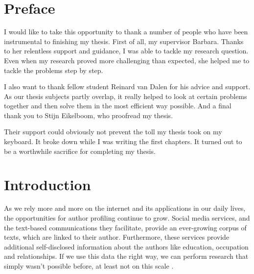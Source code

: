 \documentclass[
10pt, %
a4paper, %
oneside, %
headinclude,footinclude, %
] {book}%
\begin{document}




\chapter*{Preface}

I would like to take this opportunity to thank a number of people who have been instrumental to finishing my thesis. 
First of all, my supervisor Barbara. Thanks to her relentless support and guidance, I was able to tackle my research question. Even when my research proved more challenging than expected, she helped me to tackle the problems step by step. 

I also want to thank fellow student Reinard van Dalen for his advice and support. As our thesis subjects partly overlap, it really helped to look at certain problems together and then solve them in the most efficient way possible. And a final thank you to Stijn Eikelboom, who proofread my thesis.


Their support could obviously not prevent the toll my thesis took on my keyboard. It broke down while I was writing the first chapters. It turned out to be a worthwhile sacrifice for completing my thesis. 





\chapter{Introduction}
As we rely more and more on the internet and its applications in our daily lives, the opportunities for author profiling continue to grow. Social media services, and the text-based communications they facilitate, provide an ever-growing corpus of texts, which are linked to their author. Furthermore, these services provide additional self-disclosed information about the authors like education, occupation and relationships. If we use this data the right way, we can perform research that simply wasn't possible before, at least not on this scale \citep{sloan}.
\end{document}
